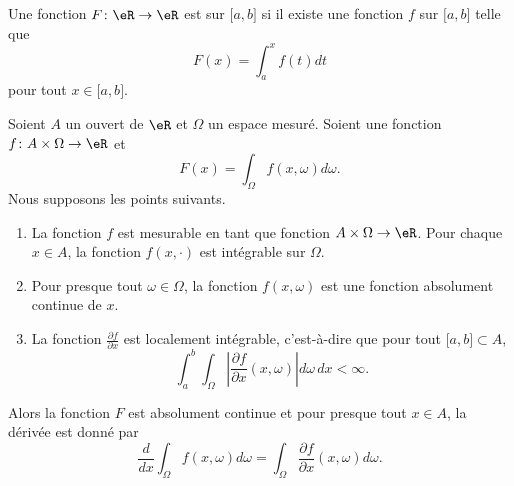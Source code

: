 \begin{definition}      \label{DefAbsoluCont}
	Une fonction \( F\colon \eR\to \eR\) est  sur \( \mathopen[ a , b \mathclose]\) si il existe une fonction \( f\) sur \( \mathopen[ a , b \mathclose]\) telle que
	\begin{equation}
		F(x)=\int_a^xf(t)dt
	\end{equation}
	pour tout \( x\in\mathopen[ a , b \mathclose]\).
\end{definition}

\begin{theorem}     \label{ThoDerSousIntegrale}
	Soient \( A\) un ouvert de \( \eR\) et \( \Omega\) un espace mesuré. Soient une fonction \( f\colon A\times \Omega\to \eR\) et
	\begin{equation}
		F(x)=\int_{\Omega}f(x,\omega)d\omega.
	\end{equation}
	Nous supposons les points suivants.
	\begin{enumerate}
		\item
		      La fonction \( f\) est mesurable en tant que fonction \( A\times\Omega\to \eR\). Pour chaque \( x\in A\), la fonction \( f(x,\cdot)\) est intégrable sur \( \Omega\).
		\item
		      Pour presque tout \( \omega\in\Omega\), la fonction \( f(x,\omega)\) est une fonction absolument continue de \( x\).
		\item
		      La fonction \( \frac{ \partial f }{ \partial x }\) est localement intégrable, c'est-à-dire que pour tout \( \mathopen[ a , b \mathclose]\subset A\),
		      \begin{equation}
			      \int_a^b\int_{\Omega}\left| \frac{ \partial f }{ \partial x }(x,\omega) \right| d\omega\,dx<\infty.
		      \end{equation}
	\end{enumerate}
	Alors la fonction \( F\) est absolument continue et pour presque tout \( x\in A\), la dérivée est donné par
	\begin{equation}
		\frac{ d }{ dx }\int_{\Omega}f(x,\omega)d\omega=\int_{\Omega}\frac{ \partial f }{ \partial x }(x,\omega)d\omega.
	\end{equation}
\end{theorem}

